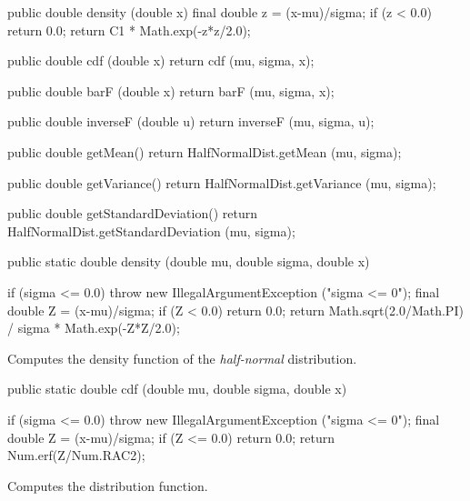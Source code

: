 \begin{code}\begin{hide}

   public double density (double x) {
      final double z = (x-mu)/sigma;
      if (z < 0.0)
         return 0.0;
      return C1 * Math.exp(-z*z/2.0);
   }

   public double cdf (double x) {
      return cdf (mu, sigma, x);
   }

   public double barF (double x) {
      return barF (mu, sigma, x);
   }

   public double inverseF (double u) {
      return inverseF (mu, sigma, u);
   }

   public double getMean() {
      return HalfNormalDist.getMean (mu, sigma);
   }

   public double getVariance() {
      return HalfNormalDist.getVariance (mu, sigma);
   }

   public double getStandardDeviation() {
      return HalfNormalDist.getStandardDeviation (mu, sigma);
   }\end{hide}

   public static double density (double mu, double sigma, double x)\begin{hide} {
      if (sigma <= 0.0)
         throw new IllegalArgumentException ("sigma <= 0");
      final double Z = (x-mu)/sigma;
      if (Z < 0.0) return 0.0;
      return Math.sqrt(2.0/Math.PI) / sigma * Math.exp(-Z*Z/2.0);
   }\end{hide}
\end{code}
\begin{tabb} Computes the density function of the {\em half-normal\/} distribution.
\end{tabb}
\begin{htmlonly}
\end{htmlonly}
\begin{code}

   public static double cdf (double mu, double sigma, double x)\begin{hide} {
      if (sigma <= 0.0)
         throw new IllegalArgumentException ("sigma <= 0");
      final double Z = (x-mu)/sigma;
      if (Z <= 0.0) return 0.0;
      return Num.erf(Z/Num.RAC2);
   }\end{hide}
\end{code}
\begin{tabb}  Computes the distribution function.
\end{tabb}
